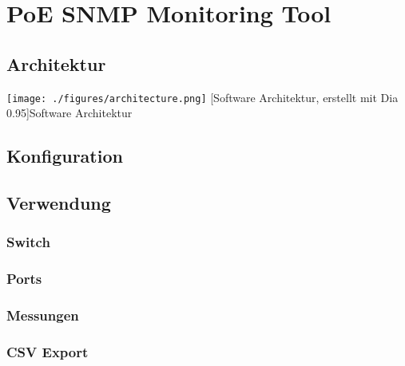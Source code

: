 \section{PoE SNMP Monitoring Tool}
\label{sec:tool}

\subsection{Architektur}

\begin{center}
\texttt{[image: ./figures/architecture.png]}
[Software Architektur, erstellt mit Dia 0.95]{Software
Architektur}
\label{fig:Abb1}

\end{center}

\subsection{Konfiguration}

\subsection{Verwendung}

\subsubsection{Switch}

\subsubsection{Ports}

\subsubsection{Messungen}

\subsubsection{CSV Export}
